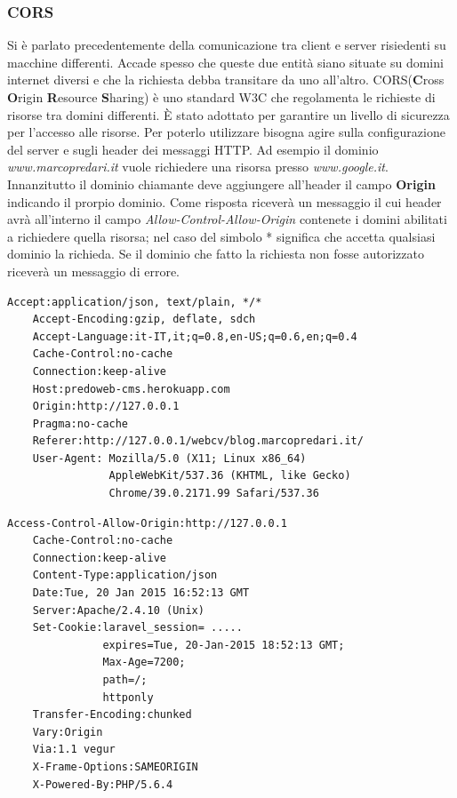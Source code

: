 \subsubsection{CORS}

Si è parlato precedentemente della comunicazione tra client e server risiedenti su macchine differenti. Accade spesso che queste due entità siano situate su domini internet diversi e che la richiesta debba transitare da uno all'altro. CORS(\textbf{C}ross \textbf{O}rigin \textbf{R}esource \textbf{S}haring) è uno standard W3C che regolamenta le richieste di risorse tra domini differenti. È stato adottato per garantire un livello di sicurezza per l'accesso alle risorse. Per poterlo utilizzare bisogna agire sulla configurazione del server e sugli header dei messaggi HTTP.
Ad esempio il dominio \emph{www.marcopredari.it} vuole richiedere una risorsa presso \emph{www.google.it}. Innanzitutto il dominio chiamante deve aggiungere all'header il campo \textbf{Origin} indicando il prorpio dominio. Come risposta riceverà un messaggio il cui header avrà all'interno il campo \textit{Allow-Control-Allow-Origin} contenete i domini abilitati a richiedere quella risorsa; nel caso del simbolo * significa che accetta qualsiasi dominio la richieda. Se il dominio che fatto la richiesta non fosse autorizzato riceverà un messaggio di errore. \cite{web:cors}

\begin{lstlisting}[caption={esempio di richiesta HTTP utilizzando CORS}, label={lst:CORSrequest}]
	Accept:application/json, text/plain, */*
	Accept-Encoding:gzip, deflate, sdch
	Accept-Language:it-IT,it;q=0.8,en-US;q=0.6,en;q=0.4
	Cache-Control:no-cache
	Connection:keep-alive
	Host:predoweb-cms.herokuapp.com
	Origin:http://127.0.0.1
	Pragma:no-cache
	Referer:http://127.0.0.1/webcv/blog.marcopredari.it/
	User-Agent: Mozilla/5.0 (X11; Linux x86_64) 
			    AppleWebKit/537.36 (KHTML, like Gecko) 
			    Chrome/39.0.2171.99 Safari/537.36
\end{lstlisting}
\begin{lstlisting}[caption={esempio di risposta dal server che utilizza CORS}, label={lst:CORSanswer}]
	Access-Control-Allow-Origin:http://127.0.0.1
	Cache-Control:no-cache
	Connection:keep-alive
	Content-Type:application/json
	Date:Tue, 20 Jan 2015 16:52:13 GMT
	Server:Apache/2.4.10 (Unix)
	Set-Cookie:laravel_session= .....
			   expires=Tue, 20-Jan-2015 18:52:13 GMT; 
			   Max-Age=7200; 
			   path=/; 
			   httponly
	Transfer-Encoding:chunked
	Vary:Origin
	Via:1.1 vegur
	X-Frame-Options:SAMEORIGIN
	X-Powered-By:PHP/5.6.4
\end{lstlisting}

